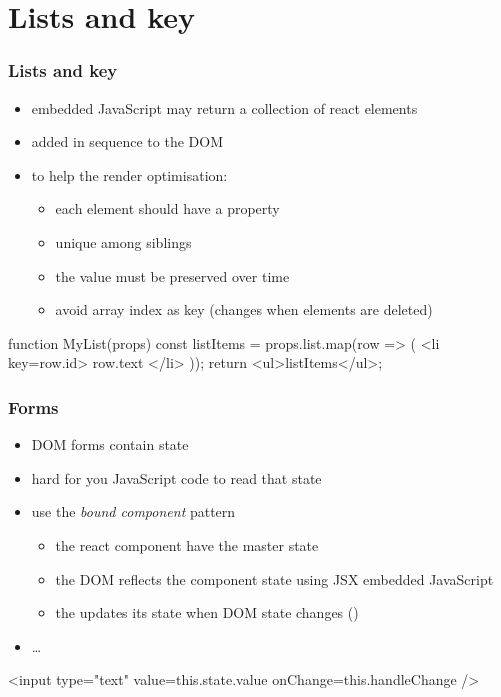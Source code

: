 \section{Lists and key}
\begin{frame}[fragile] \frametitle{Lists and key}
\begin{itemize}
  \item embedded JavaScript may return a collection of react elements
  \item added in sequence to the DOM
  \item to help the render optimisation:
  \begin{itemize}
    \item each element should have a  property
    \item unique among siblings
    \item the value must be preserved over time
    \item avoid array index as key (changes when elements are deleted)
  \end{itemize}
\end{itemize}

\begin{CodeBox}{}
function MyList(props) {
  const listItems = props.list.map(row => (
    <li key={row.id}>
      {row.text}
    </li>
  ));
  return <ul>{listItems}</ul>;
}
\end{CodeBox}
\end{frame}

\begin{frame}[fragile] \frametitle{Forms}
\begin{itemize}
  \item DOM forms contain state
  \item hard for you JavaScript code to read that state
  \item use the \emph{bound component} pattern
  \begin{itemize}
    \item the react component have the master state
    \item the DOM reflects the component state using JSX embedded JavaScript
    \item the updates its state when DOM state changes ()
  \end{itemize}
  \item {} \ldots {}
\end{itemize}
\vspace{5mm}
\begin{CodeBox}{}
<input type="text" 
        value={this.state.value}
        onChange={this.handleChange}
/>
\end{CodeBox}
\end{frame}

